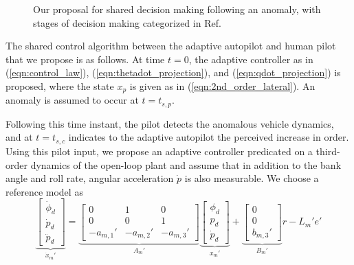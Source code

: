 \begin{figure}[h]

	\caption{Our proposal for shared decision making following an anomaly, with stages of decision making categorized in Ref.~\cite{parasuraman2000model}}
	\label{fig:response_flow}
\end{figure}

The shared control algorithm between the adaptive autopilot and human pilot that we propose is as follows. At time $t=0$, the adaptive controller as in (\ref{eqn:control_law}), (\ref{eqn:thetadot_projection}), and (\ref{eqn:qdot_projection}) is proposed, where the state $x_p$ is given as in (\ref{eqn:2nd_order_lateral}). An anomaly is assumed to occur at $t=t_{s,p}$. 

Following this time instant, the pilot detects the anomalous vehicle dynamics, and at $t=t_{s,c}$ indicates to the adaptive autopilot the perceived increase in order. Using this pilot input, we propose an adaptive controller predicated on a third-order dynamics of the open-loop plant and assume that in addition to the bank angle and roll rate, angular acceleration $\dot{p}$ is also measurable. We choose a reference model as
\begin{equation}
	\underbrace{\begin{bmatrix}
		\dot{\phi}_d \\ \dot{p}_d \\ \ddot{p}_d
	\end{bmatrix}}_{\dot{x}_m'} = \underbrace{\begin{bmatrix}
		0 & 1 & 0\\ 0 & 0 & 1 \\ -a_{m,1}' & -a_{m,2}' & -a_{m,3}'
	\end{bmatrix}}_{A_m'} \underbrace{\begin{bmatrix}
		\phi_d \\ p_d \\ \dot{p}_d
	\end{bmatrix}}_{x_m'} + \underbrace{\begin{bmatrix}
		0 \\ 0 \\ b_{m,3}'
	\end{bmatrix}}_{B_m'} r - L_m' e'
	\label{eqn:rm_3_symbolic}
\end{equation}

